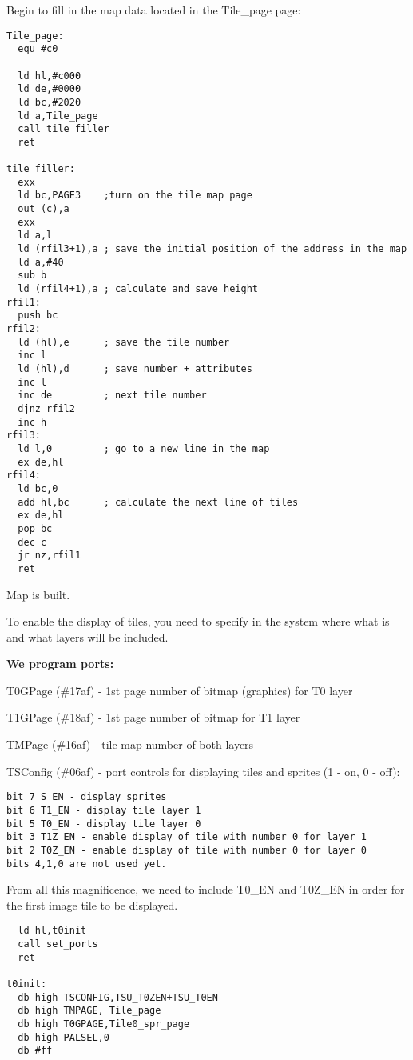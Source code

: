 \documentclass{article}
\begin{document}
Begin to fill in the map data located in the Tile\_page page:

\begin{verbatim}
Tile_page:
  equ #c0

  ld hl,#c000
  ld de,#0000
  ld bc,#2020
  ld a,Tile_page
  call tile_filler
  ret

tile_filler:
  exx
  ld bc,PAGE3    ;turn on the tile map page
  out (c),a
  exx
  ld a,l
  ld (rfil3+1),a ; save the initial position of the address in the map
  ld a,#40
  sub b
  ld (rfil4+1),a ; calculate and save height
rfil1:
  push bc
rfil2:
  ld (hl),e      ; save the tile number
  inc l
  ld (hl),d      ; save number + attributes
  inc l
  inc de         ; next tile number
  djnz rfil2
  inc h
rfil3:
  ld l,0         ; go to a new line in the map
  ex de,hl
rfil4:
  ld bc,0
  add hl,bc      ; calculate the next line of tiles
  ex de,hl
  pop bc
  dec c
  jr nz,rfil1
  ret
\end{verbatim}

Map is built.

To enable the display of tiles, you need to specify in the system
where what is and what layers will be included.

\textbf{We program ports:}

T0GPage (\#17af) - 1st page number of bitmap (graphics) for T0 layer

T1GPage (\#18af) - 1st page number of bitmap for T1 layer

TMPage (\#16af) - tile map number of both layers

TSConfig (\#06af) - port controls for displaying tiles and sprites (1
- on, 0 - off):

\begin{verbatim}
bit 7 S_EN - display sprites
bit 6 T1_EN - display tile layer 1
bit 5 T0_EN - display tile layer 0
bit 3 T1Z_EN - enable display of tile with number 0 for layer 1
bit 2 T0Z_EN - enable display of tile with number 0 for layer 0
bits 4,1,0 are not used yet.
\end{verbatim}

From all this magnificence, we need to include T0\_EN and T0Z\_EN in
order for the first image tile to be displayed.

\begin{verbatim}
  ld hl,t0init
  call set_ports
  ret
  
t0init:
  db high TSCONFIG,TSU_T0ZEN+TSU_T0EN
  db high TMPAGE, Tile_page
  db high T0GPAGE,Tile0_spr_page
  db high PALSEL,0
  db #ff
\end{verbatim}
\end{document}
